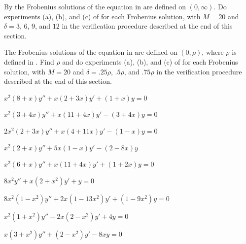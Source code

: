 \begin{exerciselist}
\item\label{exer:7.5.26}\Lex
By  the Frobenius solutions of the equation in
 are defined on $(0,\infty)$. Do experiments
(a),
(b), and (c) of  for each Frobenius
solution,
with $M=20$ and $\delta=3$, $6$, $9$, and $12$ in the verification
procedure described at the end of this section.

\item\label{exer:7.5.27}\Lex
The Frobenius solutions of the equation in  are
defined on $(0,\rho)$, where $\rho$ is defined in
. Find $\rho$ and do experiments (a),
(b), and
(c) of  for each Frobenius solution, with
$M=20$ and
$\delta=.25\rho$, $.5\rho$, and $.75\rho$ in the verification
procedure described at the end of this section.



\item\label{exer:7.5.28}\Cex $x^2(8+x)y''+x(2+3x)y'+(1+x)y=0$

\item\label{exer:7.5.29}\Cex
$x^2(3+4x)y''+x(11+4x)y'-(3+4x)y=0$

\item\label{exer:7.5.30}\Cex
$2x^2(2+3x)y''+x(4+11x)y'-(1-x)y=0$

\item\label{exer:7.5.31}\Cex
$x^2(2+x)y''+5x(1-x)y'-(2-8x)y$

\item\label{exer:7.5.32}\Cex $x^2(6+x)y''+x(11+4x)y'+(1+2x)y=0$


\item\label{exer:7.5.33}$8x^2y''+x(2+x^2)y'+y=0$

\item\label{exer:7.5.34}$8x^2(1-x^2)y''+2x(1-13x^2)y'+(1-9x^2)y=0$

\item\label{exer:7.5.35}$x^2(1+x^2)y''-2x(2-x^2)y'+4y=0$

\item\label{exer:7.5.36}$x(3+x^2)y''+(2-x^2)y'-8xy=0$


\end{exerciselist}

